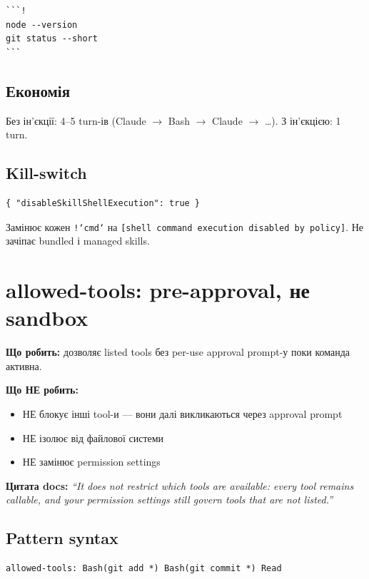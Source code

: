 \documentclass[11pt,a4paper]{article}
\begin{document}
\begin{lstlisting}
```!
node --version
git status --short
```
\end{lstlisting}

\subsection{Економія}

Без ін'єкції: 4--5 turn-ів (Claude $\to$ Bash $\to$ Claude $\to$ \dots). З ін'єкцією: 1 turn.

\subsection{Kill-switch}

\begin{lstlisting}
{ "disableSkillShellExecution": true }
\end{lstlisting}

Замінює кожен \texttt{!`cmd`} на \texttt{[shell command execution disabled by policy]}. Не зачіпає bundled і managed skills.

\section{allowed-tools: pre-approval, не sandbox}

\textbf{Що робить:} дозволяє listed tools без per-use approval prompt-у поки команда активна.

\textbf{Що НЕ робить:}
\begin{itemize}
\item НЕ блокує інші tool-и --- вони далі викликаються через approval prompt
\item НЕ ізолює від файлової системи
\item НЕ замінює permission settings
\end{itemize}

\textbf{Цитата docs:} \emph{``It does not restrict which tools are available: every tool remains callable, and your permission settings still govern tools that are not listed.''}

\subsection{Pattern syntax}

\begin{lstlisting}
allowed-tools: Bash(git add *) Bash(git commit *) Read
\end{lstlisting}
\end{document}
